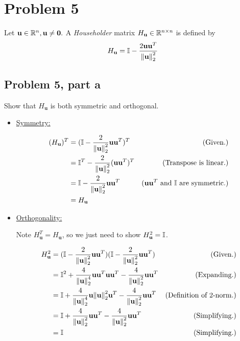 \newpage
\section{Problem 5}
Let $\textbf{u} \in \mathbb{R}^n, \textbf{u}\neq \textbf{0}.$ A \textit{Householder} matrix $H_\textbf{u} \in \mathbb{R}^{n\times n}$ is defined by 
\[
H_\textbf{u} = \mathbb{I} - \frac{2\textbf{u}\textbf{u}^T}{\norm{\textbf{u}}_2^2}
\]
\subsection{Problem 5, part a}
Show that $H_\textbf{u}$ is both symmetric and orthogonal.
\partbreak
\begin{solution}

    \begin{itemize}
        \item \underline{Symmetry:}

        \begin{align*}
            (H_\textbf{u})^T &= (\mathbb{I} - \frac{2}{\norm{\textbf{u}}_2^2}\textbf{u}\textbf{u}^T)^T &\text{(Given.)}\\
            &= \mathbb{I}^T - \frac{2}{\norm{\textbf{u}}_2^2}(\textbf{u}\textbf{u}^T)^T &\text{(Transpose is linear.)}\\
            &= \mathbb{I} - \frac{2}{\norm{\textbf{u}}_2^2}\textbf{u}\textbf{u}^T &\text{($\textbf{u}\textbf{u}^T$ and $\mathbb{I}$ are symmetric.)}\\
            &= H_\textbf{u}
        \end{align*}

        \item \underline{Orthogonality:}
        
            Note $H_\textbf{u}^T = H_\textbf{u}$, so we just need to show $H_\textbf{u}^2 = \mathbb{I}$.

            \begin{align*}
                H_\textbf{u}^2 &= (\mathbb{I} - \frac{2}{\norm{\textbf{u}}_2^2}\textbf{u}\textbf{u}^T)(\mathbb{I} - \frac{2}{\norm{\textbf{u}}_2^2}\textbf{u}\textbf{u}^T) &\text{(Given.)}\\
                &= \mathbb{I}^2 +\frac{4}{\norm{\textbf{u}}_2^4}\textbf{u}\textbf{u}^T\textbf{u}\textbf{u}^T - \frac{4}{\norm{\textbf{u}}_2^2}\textbf{u}\textbf{u}^T &\text{(Expanding.)}\\
                &= \mathbb{I} +\frac{4}{\norm{\textbf{u}}_2^4}\textbf{u}\norm{\textbf{u}}_2^2\textbf{u}^T - \frac{4}{\norm{\textbf{u}}_2^2}\textbf{u}\textbf{u}^T &\text{(Definition of 2-norm.)}\\
                &= \mathbb{I} +\frac{4}{\norm{\textbf{u}}_2^2}\textbf{u}\textbf{u}^T - \frac{4}{\norm{\textbf{u}}_2^2}\textbf{u}\textbf{u}^T &\text{(Simplifying.)}\\
                &= \mathbb{I} &\text{(Simplifying.)}
            \end{align*}
    \end{itemize}
\end{solution}

